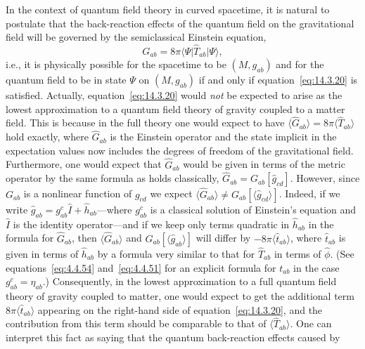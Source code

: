 In the context of quantum field theory in curved spacetime, it is natural to postulate
that the back-reaction effects of the quantum field on the gravitational field will be
governed by the semiclassical Einstein equation,
\begin{equation}
  G_{ab}=8\pi\langle\Psi\rvert\widehat T_{ab}\lvert\Psi\rangle,
  \tag{14.3.20}\label{eq:14.3.20}
\end{equation}
i.e., it is physically possible for the spacetime to be \((M,g_{ab})\) and for the
quantum field to be in state \(\Psi\) on \((M,g_{ab})\) if and only if
equation~\eqref{eq:14.3.20} is satisfied. Actually, equation~\eqref{eq:14.3.20}
would \emph{not} be expected to arise as the lowest approximation to a quantum
field theory of gravity coupled to a matter field. This is because in the full theory
one would expect to have
\(\langle\widehat G_{ab}\rangle=8\pi\langle\widehat T_{ab}\rangle\) hold
exactly, where \(\widehat G_{ab}\) is the Einstein operator and the state implicit in
the expectation values now includes the degrees of freedom of the gravitational
field. Furthermore, one would expect that \(\widehat G_{ab}\) would be given in
terms of the metric operator by the same formula as holds classically,
\(\widehat G_{ab}=G_{ab}[\widehat g_{cd}]\). However, since \(G_{ab}\) is a
nonlinear function of \(g_{cd}\) we expect
\(\langle\widehat G_{ab}\rangle\ne
G_{ab}[\langle\widehat g_{cd}\rangle]\). Indeed, if we write
\(\widehat g_{ab}=g_{ab}^{c}\widehat I+\widehat h_{ab}\)---where
\(g_{ab}^{c}\) is a classical solution of Einstein's equation and \(\widehat I\) is
the identity operator---and if we keep only terms quadratic in \(\widehat h_{ab}\)
in the formula for \(\widehat G_{ab}\), then \(\langle\widehat G_{ab}\rangle\)
and \(G_{ab}[\langle\widehat g_{ab}\rangle]\) will differ by
\(-8\pi\langle\widehat t_{ab}\rangle\), where \(\widehat t_{ab}\) is given in
terms of \(\widehat h_{ab}\) by a formula very similar to that for
\(\widehat T_{ab}\) in terms of \(\widehat\phi\). (See
equations~\eqref{eq:4.4.54} and~\eqref{eq:4.4.51} for an explicit formula for
\(t_{ab}\) in the case \(g_{ab}^{c}=\eta_{ab}\).) Consequently, in the lowest
approximation to a full quantum field theory of gravity coupled to matter, one would
expect to get the additional term \(8\pi\langle\widehat t_{ab}\rangle\) appearing
on the right-hand side of equation~\eqref{eq:14.3.20}, and the contribution from this
term should be comparable to that of \(\langle\widehat T_{ab}\rangle\). One can
interpret this fact as saying that the quantum back-reaction effects caused by
